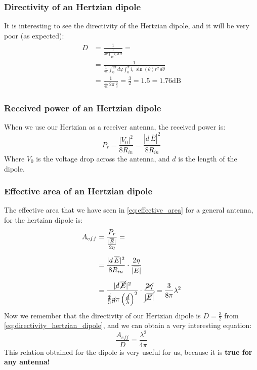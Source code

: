 \subsubsection*{Directivity of an Hertzian dipole}
It is interesting to see the directivity of the Hertzian dipole, and it will be very poor (as expected):
\begin{align}\label{eq:directivity_hertzian_dipole}
    \begin{split}
        D&=\frac{1}{\frac{1}{4\pi \int_{4\pi}i_r\,d\Omega}}=\\[5pt]
        &=\frac{1}{\frac{1}{4\pi}\int_0^{2\pi}d\varphi \int_0^\pi i_r\,\sin(\theta)r^2\,d\theta}\\[5pt]
        &=\frac{1}{\frac{1}{4\pi}\,2\pi\,\frac{4}{3}}=\frac{3}{2}=1.5=1.76\si{\deci\bel}
    \end{split}
\end{align}
\subsubsection*{Received power of an Hertzian dipole}
When we use our Hertzian as a receiver antenna, the received power is:
\begin{equation}\label{eq:hertzian_received_pow}
    P_r=\frac{|V_0|^2}{8R_{in}}=\frac{|d\,\overline{E}|^2}{8R_{in}}
\end{equation}
Where $V_0$ is the voltage drop across the antenna, and $d$ is the length of the dipole.
\subsubsection*{Effective area of an Hertzian dipole}
The effective area that we have seen in \cref{eq:effective_area} for a general antenna, for the hertzian dipole is:
\begin{align}\label{eq:effective_area_hertzian_dipole}
    \begin{split}
        A_{eff}&=\frac{P_r}{\frac{|\overline{E}|}{2\eta}}=\\[5pt]
        &=\frac{|d\,\overline{E}|^2}{8R_{in}}\cdot \frac{2\eta}{|\overline{E}|}\\[5pt]
        &=\frac{|\cancel{d}\,\cancel{\overline{E}}|^2}{\frac{\cancel{2}}{3}\cancel{\eta}\pi\left(\frac{\cancel{d}}{\lambda}\right)^2}\cdot \frac{\cancel{2\eta}}{\cancel{|\overline{E}|}}=\frac{3}{8\pi}\lambda^2
    \end{split}
\end{align}
Now we remember that the directivity of our Hertzian dipole is $D=\frac{3}{2}$ from \cref{eq:directivity_hertzian_dipole}, and we can obtain a very interesting equation:
\begin{equation}\label{eq:true_for_every_antenna}
    \frac{A_{eff}}{D}=\frac{\lambda^2}{4\pi}
\end{equation}
This relation obtained for the dipole is very useful for us, because it is \textbf{true for any antenna!}
